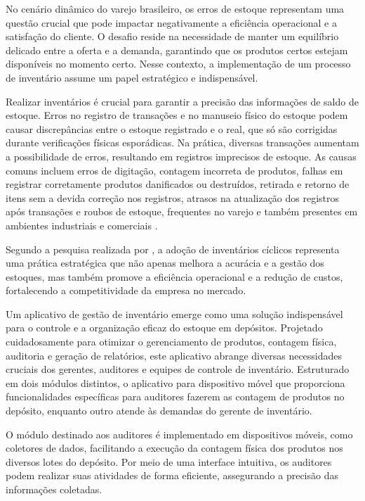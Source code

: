 
No cenário dinâmico do varejo brasileiro, os erros de estoque representam uma questão crucial que pode impactar negativamente a eficiência operacional e a satisfação do cliente. O desafio reside na necessidade de manter um equilíbrio delicado entre a oferta e a demanda, garantindo que os produtos certos estejam disponíveis no momento certo. Nesse contexto, a implementação de um processo de inventário assume um papel estratégico e indispensável.


Realizar inventários é crucial para garantir a precisão das informações de saldo de estoque. Erros no registro de transações e no manuseio físico do estoque podem causar discrepâncias entre o estoque registrado e o real, que só são corrigidas durante verificações físicas esporádicas. Na prática, diversas transações aumentam a possibilidade de erros, resultando em registros imprecisos de estoque. As causas comuns incluem erros de digitação, contagem incorreta de produtos, falhas em registrar corretamente produtos danificados ou destruídos, retirada e retorno de itens sem a devida correção nos registros, atrasos na atualização dos registros após transações e roubos de estoque, frequentes no varejo e também presentes em ambientes industriais e comerciais \cite{nigel}.

Segundo a pesquisa realizada por \cite{silva}, a adoção de inventários cíclicos representa uma prática estratégica que não apenas melhora a acurácia e a gestão dos estoques, mas também promove a eficiência operacional e a redução de custos, fortalecendo a competitividade da empresa no mercado.


Um aplicativo de gestão de inventário emerge como uma solução indispensável para o controle e a organização eficaz do estoque em depósitos. Projetado cuidadosamente para otimizar o gerenciamento de produtos, contagem física, auditoria e geração de relatórios, este aplicativo abrange diversas necessidades cruciais dos gerentes, auditores e equipes de controle de inventário. Estruturado em dois módulos distintos, o aplicativo para dispositivo móvel que proporciona funcionalidades específicas para auditores fazerem as contagem de produtos no depósito, enquanto outro atende às demandas do gerente de inventário.

O módulo destinado aos auditores é implementado em dispositivos móveis, como coletores de dados, facilitando a execução da contagem física dos produtos nos diversos lotes do depósito. Por meio de uma interface intuitiva, os auditores podem realizar suas atividades de forma eficiente, assegurando a precisão das informações coletadas.

